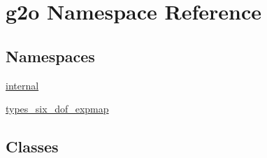 \hypertarget{namespaceg2o}{}\section{g2o Namespace Reference}
\label{namespaceg2o}
\subsection*{Namespaces}
\begin{DoxyCompactItemize}
\item 
 \hyperlink{namespaceg2o_1_1internal}{internal}
\item 
 \hyperlink{namespaceg2o_1_1types__six__dof__expmap}{types\+\_\+six\+\_\+dof\+\_\+expmap}
\end{DoxyCompactItemize}
\subsection*{Classes}
